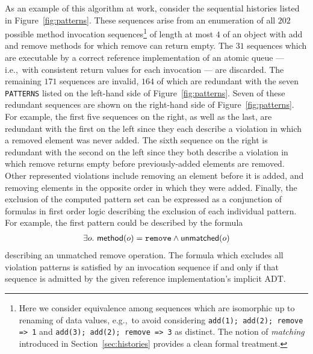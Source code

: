 As an example of this algorithm at work, consider the sequential histories
listed in Figure~\ref{fig:patterns}. These sequences arise from an enumeration
of all $202$ possible method invocation sequences\footnote{Here we consider
equivalence among sequences which are isomorphic up to renaming of data values,
e.g.,~to avoid considering {\tt add(1); add(2); remove => 1} and {\tt add(3);
add(2); remove => 3} as distinct. The notion of \emph{matching} introduced in
Section~\ref{sec:histories} provides a clean formal treatment.} of length at
most $4$ of an object with add and remove methods for which remove can return
empty. The $31$ sequences which are executable by a correct reference
implementation of an atomic queue — i.e.,~with consistent return
values for each invocation — are discarded. The remaining $171$ sequences are
invalid, $164$ of which are redundant with the seven {\tt PATTERNS} listed on
the left-hand side of Figure~\ref{fig:patterns}. Seven of these redundant
sequences are shown on the right-hand side of Figure~\ref{fig:patterns}. For
example, the first five sequences on the right, as well as the last, are
redundant with the first on the left since they each describe a violation in
which a removed element was never added. The sixth sequence on the right is
redundant with the second on the left since they both describe a violation in
which remove returns empty before previously-added elements are removed. Other
represented violations include removing an element before it is added, and
removing elements in the opposite order in which they were added. Finally, the
exclusion of the computed pattern set can be expressed as a conjunction of
formulas in first order logic describing the exclusion of each individual
pattern. For example, the first pattern could be described by the formula
\begin{align*}
  \exists o.\
    {\sf method}(o) = {\tt remove} \land {\sf unmatched}(o)
\end{align*}
describing an unmatched remove operation. The formula which excludes all
violation patterns is satisfied by an invocation sequence if and only if that
sequence is admitted by the given reference implementation’s implicit ADT.


